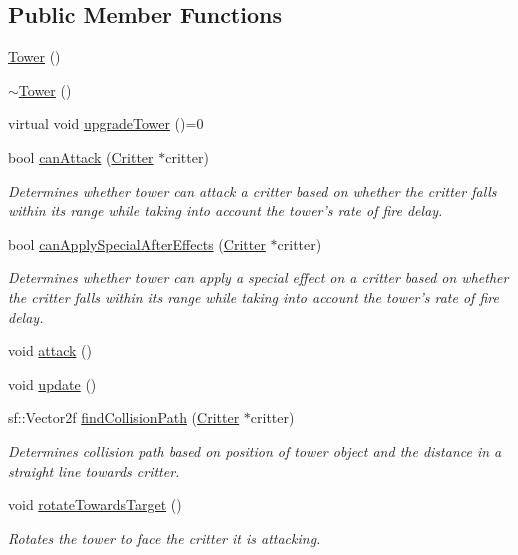 \subsection*{Public Member Functions}
\begin{DoxyCompactItemize}
\item 
\hyperlink{class_tower_a1b785dc1e9fb979a10620ca183b5761d}{Tower} ()
\item 
\hyperlink{class_tower_a96972da33c287758c036c944eccdc5fe}{$\sim$\+Tower} ()
\item 
virtual void \hyperlink{class_tower_a06801dd47796aaa9942fb3d890d2196a}{upgrade\+Tower} ()=0
\item 
bool \hyperlink{class_tower_a3bc66411a614f108ceaefd255bdb4179}{can\+Attack} (\hyperlink{class_critter}{Critter} $\ast$critter)
\begin{DoxyCompactList}\small\item\em Determines whether tower can attack a critter based on whether the critter falls within its range while taking into account the tower's rate of fire delay. \end{DoxyCompactList}\item 
bool \hyperlink{class_tower_aa4d0884a1fc45d6b47e8ed4a3cd23b34}{can\+Apply\+Special\+After\+Effects} (\hyperlink{class_critter}{Critter} $\ast$critter)
\begin{DoxyCompactList}\small\item\em Determines whether tower can apply a special effect on a critter based on whether the critter falls within its range while taking into account the tower's rate of fire delay. \end{DoxyCompactList}\item 
void \hyperlink{class_tower_a9f067c2b9e5e6987f341704b8b098606}{attack} ()
\item 
void \hyperlink{class_tower_a127550c2fb83a1b51b10f13bbba18707}{update} ()
\item 
sf\+::\+Vector2f \hyperlink{class_tower_acfb9cb7c1b2c1573929ff7d618aa996b}{find\+Collision\+Path} (\hyperlink{class_critter}{Critter} $\ast$critter)
\begin{DoxyCompactList}\small\item\em Determines collision path based on position of tower object and the distance in a straight line towards critter. \end{DoxyCompactList}\item 
void \hyperlink{class_tower_a7deaf3f9565d32468d3056fa5bcc43b0}{rotate\+Towards\+Target} ()
\begin{DoxyCompactList}\small\item\em Rotates the tower to face the critter it is attacking. \end{DoxyCompactList}\item 

\end{DoxyCompactItemize}
